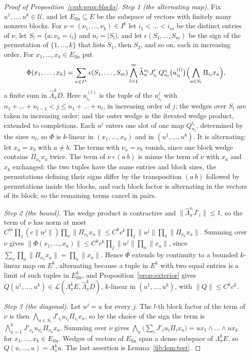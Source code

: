 \documentclass[11pt]{amsart}
\theoremstyle{definition}
\theoremstyle{remark}
\numberwithin{equation}{section}
\newcommand{\cL}{\mathcal L}
\newcommand{\abs}[1]{\lvert #1\rvert}
\newcommand{\norm}[1]{\lVert #1\rVert}
\theoremstyle{plain}
\theoremstyle{definition}
\theoremstyle{plain}
\begin{document}
\begin{proof}[Proof of Proposition~\ref{cmb:prop:blocks}]
\emph{Step 1 (the alternating map).} Fix $u^1,\dots,u^k\in\mathcal U$, and let $E_{\mathrm{fin}}\subseteq E$ be the
subspace of vectors with finitely many nonzero blocks. For $\nu=(\nu_1,\dots,\nu_k)\in I^k$ let $i_1<\dots<i_m$ be the
distinct entries of $\nu$, let $S_l=\{a:\nu_a=i_l\}$ and $n_l=\abs{S_l}$, and let $\epsilon(S_1,\dots,S_m)$ be the sign of
the permutation of $\{1,\dots,k\}$ that lists $S_1$, then $S_2$, and so on, each in increasing order. For
$x_1,\dots,x_k\in E_{\mathrm{fin}}$ put
\[
 \Phi(x_1,\dots,x_k)=\sum_{\nu\in I^k}\epsilon(S_1,\dots,S_m)\bigwedge_{l=1}^m\widehat\Lambda^{n_l}_\pi J'_{i_l}\,
 Q^{i_l}_{n_l}\bigl(u^{(l)}_{i_l}\bigr)\Bigl(\bigwedge_{a\in S_l}\Pi_{i_l}x_a\Bigr),
\]
a finite sum in $\widehat\Lambda^k_\pi D$. Here $u^{(l)}_{i_l}$ is the tuple of the $u^j_{i_l}$ with
$n_1+\dots+n_{l-1}<j\le n_1+\dots+n_l$, in increasing order of $j$; the wedges over $S_l$ are taken in increasing order;
and the outer wedge is the iterated wedge product, extended to completions. Each $u^j$ enters one slot of one map
$Q^{i_l}_{n_l}$, determined by the sizes $n_l$, so $\Phi$ is $k$-linear in $(x_1,\dots,x_k)$ and in $(u^1,\dots,u^k)$.
It is alternating: let $x_a=x_b$ with $a\ne b$. The terms with $\nu_a=\nu_b$ vanish, since one block wedge contains
$\Pi_{\nu_a}x_a$ twice. The term of $\nu\circ(a\ b)$ is minus the term of $\nu$ with $x_a$ and $x_b$ exchanged: the two
tuples have the same entries and block sizes, the permutations defining their signs differ by the transposition $(a\ b)$
followed by permutations inside the blocks, and each block factor is alternating in the vectors of its block; so the
remaining terms cancel in pairs.

\emph{Step 2 (the bound).} The wedge product is contractive and $\norm{\widehat\Lambda^n_\pi J'_i}\le1$, so the term of
$\nu$ has norm at most $C^m\prod_j(c\norm{u^j})\prod_a\norm{\Pi_{\nu_a}x_a}\le C^kc^k\prod_j\norm{u^j}\prod_a
\norm{\Pi_{\nu_a}x_a}$. Summing over $\nu$ gives $\norm{\Phi(x_1,\dots,x_k)}\le C^kc^k\prod_j\norm{u^j}\prod_a\norm{x_a}$,
since $\sum_\nu\prod_a\norm{\Pi_{\nu_a}x_a}=\prod_a\norm{x_a}$. Hence $\Phi$ extends by continuity to a bounded
$k$-linear map on $E^k$, alternating because a tuple in $E^k$ with two equal entries is a limit of such tuples in
$E_{\mathrm{fin}}^k$, and Proposition~\ref{prop:exterior} gives $Q(u^1,\dots,u^k)\in\cL(\Lambda^k_\pi E,\widehat\Lambda^k_\pi D)$,
$k$-linear in $(u^1,\dots,u^k)$, with $\norm Q\le C^kc^k$.

\emph{Step 3 (the diagonal).} Let $u^j=u$ for every $j$. The $l$-th block factor of the term of $\nu$ is then
$\bigwedge_{a\in S_l}J'_{i_l}u_{i_l}\Pi_{i_l}x_a$, so by the choice of the sign the term is
$\bigwedge_{a=1}^kJ'_{\nu_a}u_{\nu_a}\Pi_{\nu_a}x_a$. Summing over $\nu$ gives
$\bigwedge_a\bigl(\sum_iJ'_iu_i\Pi_ix_a\bigr)=ux_1\wedge\dots\wedge ux_k$ for $x_1,\dots,x_k\in E_{\mathrm{fin}}$. Wedges
of vectors of $E_{\mathrm{fin}}$ span a dense subspace of $\Lambda^k_\pi E$, so $Q(u,\dots,u)=\Lambda^k_\pi u$. The last
assertion is Lemma~\ref{fib:lem:test}.
\end{proof}
\end{document}
